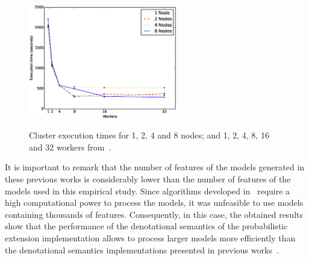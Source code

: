 \begin{figure}[t]
        \centering
        \linefigure
        \\
        \includegraphics[width=0.7\hsize, height=5cm,angle=0]{plot_cluster.eps}
        \linefigure
        \caption{Cluster execution times for 1, 2, 4 and 8 nodes; and 1, 2, 4, 8, 16 and 32 workers  from~\cite{clc16}.}\label{fig:cluster}
\end{figure}

It is important to remark that the number of features of the models generated in 
these previous works is considerably lower than the number of features of the models 
used in this empirical study. Since algorithms developed in~\cite{acl13,clc16} require a 
high computational power to process the models,
it was unfeasible to use models containing thousands of features. Consequently, in this case,
the obtained results show that the performance of the denotational semantics of the 
probabilistic extension implementation allows to process larger models more efficiently than 
the denotational semantics implementations presented in previous works~\cite{acl13,clc16}.


